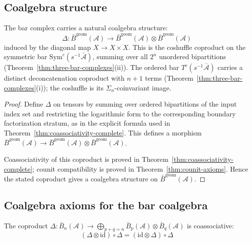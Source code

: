 \subsection{Coalgebra structure}

\begin{theorem}\label{thm:bar-coalgebra}
The bar complex carries a natural coalgebra structure:
\[\Delta: \bar{B}^{\text{geom}}(\mathcal{A}) \to \bar{B}^{\text{geom}}(\mathcal{A}) \otimes \bar{B}^{\text{geom}}(\mathcal{A})\]
induced by the diagonal map $X \to X \times X$.
This is the coshuffle coproduct on the symmetric bar $\mathrm{Sym}^c(s^{-1}\bar{\mathcal{A}})$, summing over all $2^n$ unordered bipartitions (Theorem~\textup{\ref{thm:three-bar-complexes}}\textup{(ii)}). The ordered bar $T^c(s^{-1}\bar{\mathcal{A}})$ carries a distinct deconcatenation coproduct with $n+1$ terms (Theorem~\textup{\ref{thm:three-bar-complexes}}\textup{(i)}); the coshuffle is its $\Sigma_n$-coinvariant image.
\end{theorem}

\begin{proof}
Define $\Delta$ on tensors by summing over ordered bipartitions of the input
index set and restricting the logarithmic form to the corresponding boundary
factorization stratum, as in the explicit formula used in
Theorem~\ref{thm:coassociativity-complete}. This defines a morphism
$\bar{B}^{\mathrm{geom}}(\mathcal{A})\to
\bar{B}^{\mathrm{geom}}(\mathcal{A})\otimes\bar{B}^{\mathrm{geom}}(\mathcal{A})$.

Coassociativity of this coproduct is proved in
Theorem~\ref{thm:coassociativity-complete}; counit compatibility is proved in
Theorem~\ref{thm:counit-axioms}. Hence the stated coproduct gives a coalgebra
structure on $\bar{B}^{\mathrm{geom}}(\mathcal{A})$.
\end{proof}

\subsection{Coalgebra axioms for the bar coalgebra}
\label{subsec:coalgebra-axioms-complete}

\begin{theorem}\label{thm:coassociativity-complete}
The coproduct $\Delta: \bar{B}_n(\mathcal{A}) \to \bigoplus_{p+q=n} \bar{B}_p(\mathcal{A}) \otimes \bar{B}_q(\mathcal{A})$ is coassociative:
\[(\Delta \otimes \text{id}) \circ \Delta = (\text{id} \otimes \Delta) \circ \Delta\]
\end{theorem}

